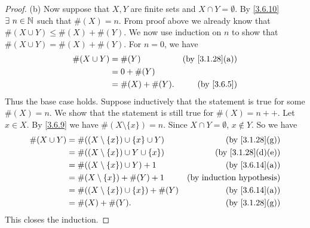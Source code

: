 \begin{proof}{(b)}
  Now suppose that \(X, Y\) are finite sets and \(X \cap Y = \emptyset\).
  By \cref{3.6.10} \(\exists\ n \in \N\) such that \(\#(X) = n\).
  From proof above we already know that \(\#(X \cup Y) \leq \#(X) + \#(Y)\).
  We now use induction on \(n\) to show that \(\#(X \cup Y) = \#(X) + \#(Y)\).
  For \(n = 0\), we have
  \begin{align*}
    \#(X \cup Y) & = \#(Y)          & \text{(by \cref{3.1.28}(a))} \\
                 & = 0 + \#(Y)                                     \\
                 & = \#(X) + \#(Y). & \text{(by \cref{3.6.5})}
  \end{align*}
  Thus the base case holds.
  Suppose inductively that the statement is true for some \(\#(X) = n\).
  We show that the statement is still true for \(\#(X) = n++\).
  Let \(x \in X\).
  By \cref{3.6.9} we have \(\#(X \setminus \{x\}) = n\).
  Since \(X \cap Y = \emptyset\), \(x \notin Y\).
  So we have
  \begin{align*}
    \#(X \cup Y) & = \#((X \setminus \{x\}) \cup \{x\} \cup Y)  & \text{(by \cref{3.1.28}(g))}     \\
                 & = \#((X \setminus \{x\}) \cup Y \cup \{x\})  & \text{(by \cref{3.1.28}(d)(e))}  \\
                 & = \#((X \setminus \{x\}) \cup Y) + 1         & \text{(by \cref{3.6.14}(a))}     \\
                 & = \#(X \setminus \{x\}) + \#(Y) + 1          & \text{(by induction hypothesis)} \\
                 & = \#((X \setminus \{x\}) \cup \{x\}) + \#(Y) & \text{(by \cref{3.6.14}(a))}     \\
                 & = \#(X) + \#(Y).                             & \text{(by \cref{3.1.28}(g))}
  \end{align*}
  This closes the induction.
\end{proof}

